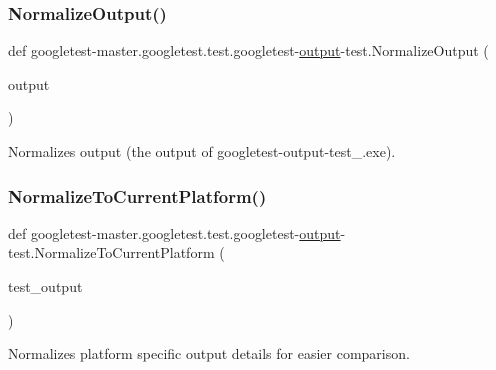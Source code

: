 \subsubsection{\texorpdfstring{NormalizeOutput()}{NormalizeOutput()}}
{\footnotesize\ttfamily def googletest-\/master.\+googletest.\+test.\+googletest-\/\mbox{\hyperlink{namespacegoogletest-master_1_1googletest_1_1test_1_1googletest-output-test_a734f0a5bd94ba038f4350763c6977129}{output}}-\/test.\+Normalize\+Output (\begin{DoxyParamCaption}\item[{}]{output }\end{DoxyParamCaption})}

\begin{DoxyVerb}Normalizes output (the output of googletest-output-test_.exe).\end{DoxyVerb}
 \mbox{\label{namespacegoogletest-master_1_1googletest_1_1test_1_1googletest-output-test_abca7185452020485c9396b5ff4363d70}} 
\subsubsection{\texorpdfstring{NormalizeToCurrentPlatform()}{NormalizeToCurrentPlatform()}}
{\footnotesize\ttfamily def googletest-\/master.\+googletest.\+test.\+googletest-\/\mbox{\hyperlink{namespacegoogletest-master_1_1googletest_1_1test_1_1googletest-output-test_a734f0a5bd94ba038f4350763c6977129}{output}}-\/test.\+Normalize\+To\+Current\+Platform (\begin{DoxyParamCaption}\item[{}]{test\+\_\+output }\end{DoxyParamCaption})}

\begin{DoxyVerb}Normalizes platform specific output details for easier comparison.\end{DoxyVerb}
 \mbox{\label{namespacegoogletest-master_1_1googletest_1_1test_1_1googletest-output-test_ae2093a22c4f977ed13069650e4534fff}} 
